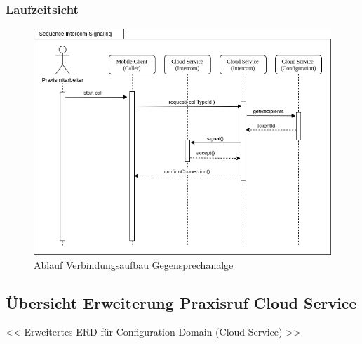 \subsubsection*{Laufzeitsicht}

\begin{figure}[h]
    \centering
    \begin{minipage}[b]{0.9\textwidth}
        \includegraphics[width=\textwidth]{graphics/diagramms/Sequence_Intercom_Broking_V01}
        \caption{Ablauf Verbindungsaufbau Gegensprechanalge}
    \end{minipage}
\end{figure}

\clearpage

\subsection{Übersicht Erweiterung Praxisruf Cloud Service}

<< Erweitertes ERD für Configuration Domain (Cloud Service) >>

\clearpage
